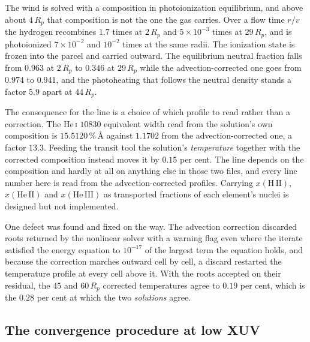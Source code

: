 \documentclass[english,a4paper]{my_memo}
\begin{document}
The wind is solved with a composition in photoionization equilibrium, and
above about $4\,R_p$ that composition is not the one the gas carries. Over a
flow time $r/v$ the hydrogen recombines $1.7$ times at $2\,R_p$ and
$5\times10^{-3}$ times at $29\,R_p$, and is photoionized $7\times10^{-2}$ and
$10^{-2}$ times at the same radii. The ionization state is frozen into the
parcel and carried outward. The equilibrium neutral fraction falls from
$0.963$ at $2\,R_p$ to $0.346$ at $29\,R_p$ while the advection-corrected one
goes from $0.974$ to $0.941$, and the photoheating that follows the neutral
density stands a factor $5.9$ apart at $44\,R_p$.

The consequence for the line is a choice of which profile to read rather than
a correction. The He\,\textsc{i} $10830$ equivalent width read from the
solution's own composition is $15.5120$\,\%\,\AA{} against $1.1702$ from the
advection-corrected one, a factor $13.3$. Feeding the transit tool the
solution's \emph{temperature} together with the corrected composition instead
moves it by $0.15$ per cent. The line depends on the composition and hardly
at all on anything else in those two files, and every line number here is
read from the advection-corrected profiles. Carrying
$x(\mathrm{H\,II})$, $x(\mathrm{He\,II})$ and $x(\mathrm{He\,III})$ as
transported fractions of each element's nuclei is designed but not
implemented.

One defect was found and fixed on the way. The advection correction discarded
roots returned by the nonlinear solver with a warning flag even where the
iterate satisfied the energy equation to $10^{-17}$ of the largest term the
equation holds, and because the correction marches outward cell by cell, a
discard restarted the temperature profile at every cell above it. With the
roots accepted on their residual, the $45$ and $60\,R_p$ corrected
temperatures agree to $0.19$ per cent, which is the $0.28$ per cent at which
the two \emph{solutions} agree.

\subsection{The convergence procedure at low XUV}
\end{document}
